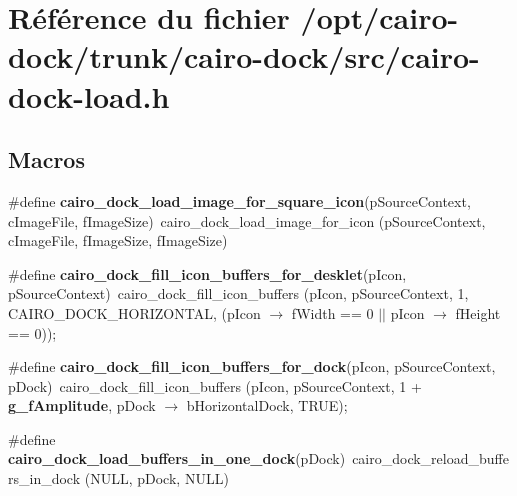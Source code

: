 \section{Référence du fichier /opt/cairo-dock/trunk/cairo-dock/src/cairo-dock-load.h}
\label{cairo-dock-load_8h}
\subsection*{Macros}
\begin{CompactItemize}
\item 
\#define {\bf cairo\_\-dock\_\-load\_\-image\_\-for\_\-square\_\-icon}(pSourceContext, cImageFile, fImageSize)~cairo\_\-dock\_\-load\_\-image\_\-for\_\-icon (pSourceContext, cImageFile, fImageSize, fImageSize)
\item 
\#define {\bf cairo\_\-dock\_\-fill\_\-icon\_\-buffers\_\-for\_\-desklet}(pIcon, pSourceContext)~cairo\_\-dock\_\-fill\_\-icon\_\-buffers (pIcon, pSourceContext, 1, CAIRO\_\-DOCK\_\-HORIZONTAL, (pIcon $\rightarrow$ fWidth == 0 $|$$|$ pIcon $\rightarrow$ fHeight == 0));
\item 
\#define {\bf cairo\_\-dock\_\-fill\_\-icon\_\-buffers\_\-for\_\-dock}(pIcon, pSourceContext, pDock)~cairo\_\-dock\_\-fill\_\-icon\_\-buffers (pIcon, pSourceContext, 1 + {\bf g\_\-fAmplitude}, pDock $\rightarrow$ bHorizontalDock, TRUE);
\item 
\#define {\bf cairo\_\-dock\_\-load\_\-buffers\_\-in\_\-one\_\-dock}(pDock)~cairo\_\-dock\_\-reload\_\-buffers\_\-in\_\-dock (NULL, pDock, NULL)
\end{CompactItemize}
